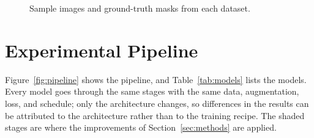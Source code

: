 \documentclass[10pt,twoside]{article}
\begin{document}
\begin{figure}[t]
\centering
{}
\caption{Sample images and ground-truth masks from each dataset.}\label{fig:samples}
\end{figure}

\section{Experimental Pipeline}\label{sec:pipeline}
Figure~\ref{fig:pipeline} shows the pipeline, and Table~\ref{tab:models} lists the
models. Every model goes through the same stages with the same data, augmentation,
loss, and schedule; only the architecture changes, so differences in the results can
be attributed to the architecture rather than to the training recipe. The shaded
stages are where the improvements of Section~\ref{sec:methods} are applied.
\end{document}
